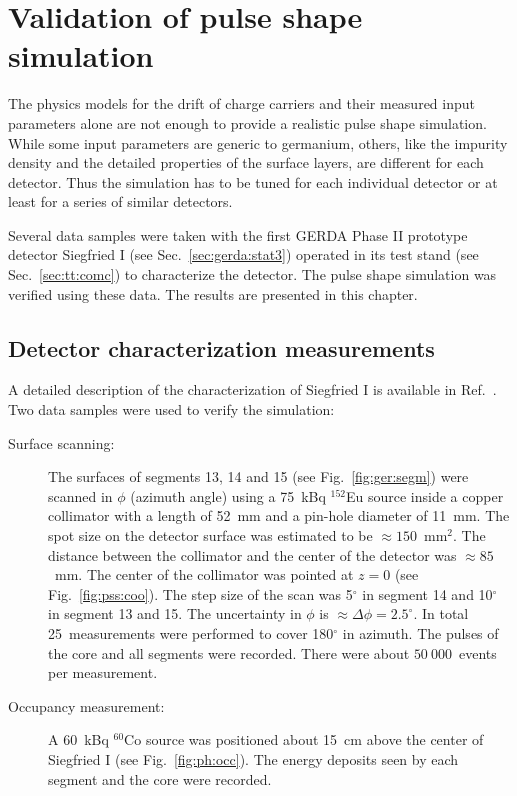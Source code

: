 \chapter{Validation of pulse shape simulation}
\label{cha:psa}
The physics models \cite{miha, bart} for the drift of charge carriers and their measured input parameters \cite{miha, bart} alone are not enough to provide a realistic pulse shape simulation. While some input parameters are generic to germanium, others, like the impurity density and the detailed properties of the surface layers, are different for each detector. Thus the simulation has to be tuned for each individual detector or at least for a series of similar detectors. 

Several data samples were taken with the first GERDA Phase II prototype detector Siegfried I (see Sec.~\ref{sec:gerda:stat3}) operated in its test stand (see Sec.~\ref{sec:tt:comc}) to characterize the detector. The pulse shape simulation  was verified using these data. The results are presented in this chapter.

\section{Detector characterization measurements}
\label{sec:psa:char}
A detailed description of the characterization of Siegfried I is available in Ref.~\cite{Sie07}. Two data samples were used to verify the simulation:
\begin{description}
\item[Surface scanning:] The surfaces of segments 13, 14 and 15 (see Fig.~\ref{fig:ger:segm}) were scanned in $\phi$ (azimuth angle) using a 75~kBq $^{152}$Eu source inside a copper collimator with a length of 52~mm and a pin-hole diameter of 11~mm. The spot size on the detector surface was estimated to be $\approx 150$~mm$^{2}$. The distance between the collimator and the center of the detector was $\approx 85$~mm. The center of the collimator was pointed at $z = 0$ (see Fig.~\ref{fig:pss:coo}). 
The step size of the scan was  5$^{\circ}$ in segment 14 and 10$^{\circ}$ in segment 13 and 15. The uncertainty in $\phi$ is $\approx \Delta \phi=2.5^{\circ}$. In total 25~measurements were performed to cover 180$^{\circ}$ in azimuth. The pulses of the core and all segments were recorded. There were about $50\ 000$~events per measurement.
\item[Occupancy measurement:] A 60~kBq $^{60}$Co source was positioned about 15~cm above the center of Siegfried I (see Fig.~\ref{fig:ph:occ}). The energy deposits seen by each segment and the core were recorded.
\end{description}

